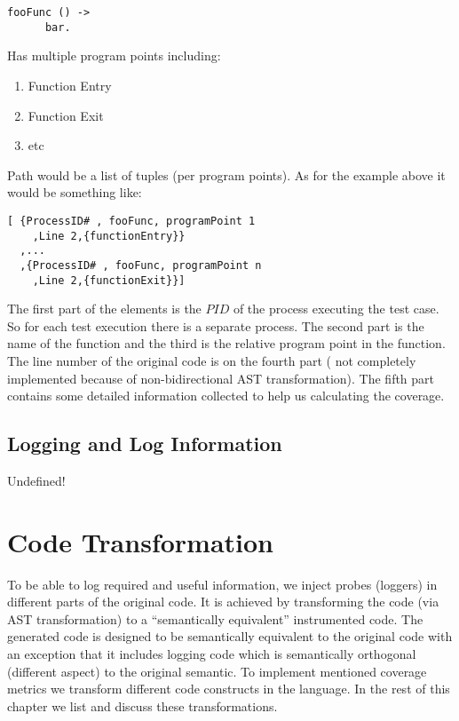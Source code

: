\documentclass[12pt,a4paper]{report}
\begin{document}
\begin{lstlisting}
fooFunc () -> 
      bar.  
\end{lstlisting}

Has multiple program points including:

\begin{enumerate}
 \item Function Entry
 \item Function Exit
 \item etc
\end{enumerate}
 
Path would be a list of tuples (per program points). As for the example above it would be something like:

\begin{lstlisting}
[ {ProcessID# , fooFunc, programPoint 1
    ,Line 2,{functionEntry}}
  ,...
  ,{ProcessID# , fooFunc, programPoint n
    ,Line 2,{functionExit}}]
\end{lstlisting}

The first part of the elements is the $PID$ of the process executing the test case. So for each test execution there is a separate process. The second part is the name of the
 function and the third is the relative program point in the function. The line number of the original code is on the fourth part ( not completely implemented because of
 non-bidirectional AST transformation). The fifth part contains some detailed information collected to help us calculating the coverage.   

\subsection{Logging and Log Information}
Undefined!

\section{Code Transformation}
To be able to log required and useful information, we inject probes (loggers) in different parts of the original code. It is achieved by transforming the code (via AST
 transformation) to a “semantically equivalent” instrumented code. The generated code is designed to be semantically equivalent to the original code with an exception that it
 includes logging code which is semantically orthogonal (different aspect) to the original semantic. To implement mentioned coverage metrics we transform different code
 constructs in the language. In the rest of this chapter we list and discuss these transformations.
\end{document}
